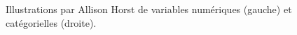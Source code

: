\documentclass[
  11pt,
  letterpaper,
]{scrbook}
\theoremstyle{definition}
\theoremstyle{remark}
\begin{document}
\begin{figure}

\begin{minipage}[t]{0.45\linewidth}

{\centering 


}

\end{minipage}%
%
\begin{minipage}[t]{0.55\linewidth}

{\centering 


}

\end{minipage}%

\caption{\label{fig-types-variables}Illustrations par Allison Horst de
variables numériques (gauche) et catégorielles (droite).}

\end{figure}
\end{document}
